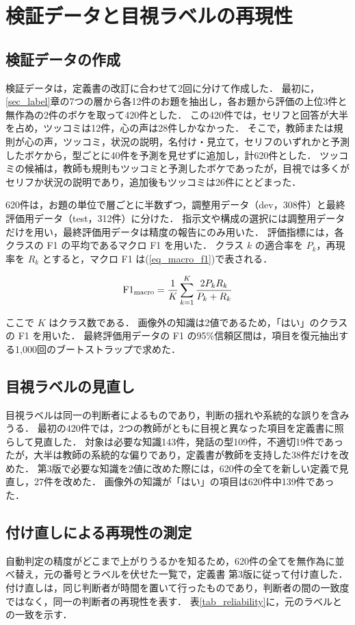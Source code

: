 \section{検証データと目視ラベルの再現性}
\label{sec_validation}
\subsection{検証データの作成}
検証データは，定義書の改訂に合わせて2回に分けて作成した．
最初に，\ref{sec_label}章の7つの層から各12件のお題を抽出し，各お題から評価の上位3件と無作為の2件のボケを取って420件とした．
この420件では，セリフと回答が大半を占め，ツッコミは12件，心の声は28件しかなかった．
そこで，教師または規則が心の声，ツッコミ，状況の説明，名付け・見立て，セリフのいずれかと予測したボケから，型ごとに40件を予測を見せずに追加し，計620件とした．
ツッコミの候補は，教師も規則もツッコミと予測したボケであったが，目視では多くがセリフか状況の説明であり，追加後もツッコミは26件にとどまった．

620件は，お題の単位で層ごとに半数ずつ，調整用データ（dev，308件）と最終評価用データ（test，312件）に分けた．
指示文や構成の選択には調整用データだけを用い，最終評価用データは精度の報告にのみ用いた．
評価指標には，各クラスの F1 の平均であるマクロ F1 を用いた．
クラス $ k $ の適合率を $ P_k $，再現率を $ R_k $ とすると，マクロ F1 は(\ref{eq_macro_f1})で表される．

\begin{equation}
    {\rm F1}_{\rm macro} = \frac{1}{K} \sum_{k=1}^{K} \frac{2 P_k R_k}{P_k + R_k}
    \label{eq_macro_f1}
\end{equation}

\noindent
ここで $ K $ はクラス数である．
画像外の知識は2値であるため，「はい」のクラスの F1 を用いた．
最終評価用データの F1 の95\%信頼区間は，項目を復元抽出する1,000回のブートストラップで求めた．

\subsection{目視ラベルの見直し}
目視ラベルは同一の判断者によるものであり，判断の揺れや系統的な誤りを含みうる．
最初の420件では，2つの教師がともに目視と異なった項目を定義書に照らして見直した．
対象は必要な知識143件，発話の型109件，不適切19件であったが，大半は教師の系統的な偏りであり，定義書が教師を支持した38件だけを改めた．
第3版で必要な知識を2値に改めた際には，620件の全てを新しい定義で見直し，27件を改めた．
画像外の知識が「はい」の項目は620件中139件であった．

\subsection{付け直しによる再現性の測定}
自動判定の精度がどこまで上がりうるかを知るため，620件の全てを無作為に並べ替え，元の番号とラベルを伏せた一覧で，定義書 第3版に従って付け直した．
付け直しは，同じ判断者が時間を置いて行ったものであり，判断者の間の一致度ではなく，同一の判断者の再現性を表す．
表\ref{tab_reliability}に，元のラベルとの一致を示す．

